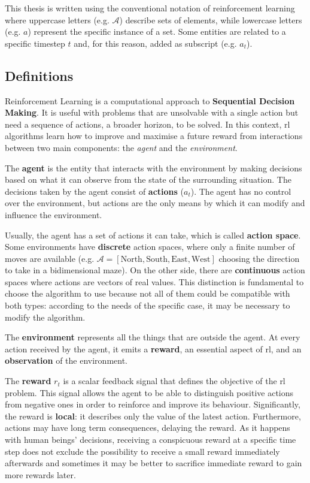 This thesis is written using the conventional notation of reinforcement learning where uppercase letters (e.g. $\mathcal{A}$) describe sets of elements, while lowercase letters (e.g. $a$) represent the specific instance of a set. Some entities are related to a specific timestep $t$ and, for this reason, added as subscript (e.g. $a_t$).

\subsection{Definitions}

Reinforcement Learning is a computational approach to \textbf{Sequential Decision Making}. It is useful with problems that are unsolvable with a single action but need a sequence of actions, a broader horizon, to be solved. In this context, \gls{rl} algorithms learn how to improve and maximise a future reward from interactions between two main components: the \textit{agent} and the \textit{environment}. 

The \textbf{agent} is the entity that interacts with the environment by making decisions based on what it can observe from the state of the surrounding situation. The decisions taken by the agent consist of \textbf{actions} ($a_t$).  The agent has no control over the environment, but actions are the only means by which it can modify and influence the environment.

Usually, the agent has a set of actions it can take, which is called \textbf{action space}.
Some environments have \textbf{discrete} action spaces, where only a finite number of moves are available (e.g. $\mathcal{A} = [\text{North}, \text{South}, \text{East}, \text{West}]$ choosing the direction to take in a bidimensional maze). On the other side, there are \textbf{continuous} action spaces where actions are vectors of real values.
This distinction is fundamental to choose the algorithm to use because not all of them could be compatible with both types: according to the needs of the specific case, it may be necessary to modify the algorithm.

The \textbf{environment} represents all the things that are outside the agent. At every action received by the agent, it emits a \textbf{reward}, an essential aspect of \gls{rl}, and an \textbf{observation} of the environment.

The \textbf{reward} $r_t$ is a scalar feedback signal that defines the objective of the \gls{rl} problem. This signal allows the agent to be able to distinguish positive actions from negative ones in order to reinforce and improve its behaviour. Significantly, the reward is \textbf{local}: it describes only the value of the latest action. Furthermore, actions may have long term consequences, delaying the reward. As it happens with human beings' decisions, receiving a conspicuous reward at a specific time step does not exclude the possibility to receive a small reward immediately afterwards and sometimes it may be better to sacrifice immediate reward to gain more rewards later.


